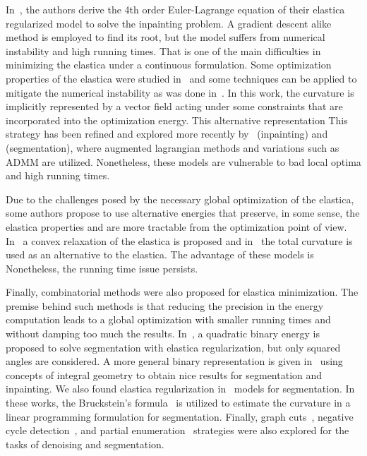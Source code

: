 \documentclass[review]{siamart220329}
\begin{document}
In~\cite{chan02elasticainpainting}, the authors derive the 4th order
Euler-Lagrange equation of their elastica regularized model to solve
the inpainting problem. A gradient descent alike method is employed to
find its root, but the model suffers from numerical instability and
high running times. That is one of the main difficulties in minimizing
the elastica under a continuous formulation. Some optimization
properties of the elastica were studied in~\cite{ambrosio2003direct}
and some techniques can be applied to mitigate the numerical
instability as was done in~\cite{ballester01filljoint}. In this work,
the curvature is implicitly represented by a vector field acting under
some constraints that are incorporated into the optimization
energy. This alternative representation  This strategy has been refined
and explored more recently by~\cite{tai11elastica} (inpainting)
and~\cite{zhu2013image,duan2014two} (segmentation), where augmented
lagrangian methods and variations such as ADMM are
utilized. Nonetheless, these models are vulnerable to bad local optima
and  high running times.


Due to the challenges posed by the necessary global optimization of
the elastica, some authors propose to use alternative energies that
preserve, in some sense, the elastica properties and are more
tractable from the optimization point of
view. In~\cite{bredies15convex} a convex relaxation of the elastica is
proposed and in~\cite{goldluecke11totalcurvature,zhong2020minimizing}
the total curvature is used as an alternative to the elastica. The
advantage of these models is  Nonetheless, the running time
issue persists.


Finally, combinatorial methods were also proposed for elastica minimization. The
premise behind such methods is that reducing the precision in the energy
computation leads to a global optimization with smaller running times and
without damping too much the results. In~\cite{zehiry10fast}, a quadratic binary
energy is proposed to solve segmentation with elastica regularization, but only 
squared angles are considered. A more general binary representation is given 
in~\cite{nieuwenhuis14efficient} using concepts of integral geometry to obtain
nice results for segmentation and inpainting. We also found elastica 
regularization in~\cite{schoenemann09linear,strandmark11globalframework} models 
for segmentation. In these works, the Bruckstein's 
formula~\cite{bruckstein01convergence} is utilized to estimate the curvature 
in a linear programming formulation for segmentation. Finally, 
graph cuts~\cite{bae2010graph}, negative cycle 
detection~\cite{schoenemann2011elastic}, and partial 
enumeration~\cite{olsson2013partial,antunes20} strategies were also explored 
for the tasks of denoising and segmentation.
\end{document}
